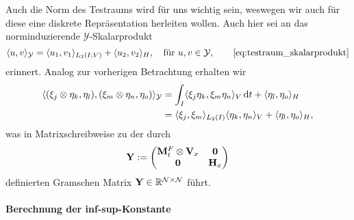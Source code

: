 \documentclass[../main.tex]{subfiles}
\begin{document}
Auch die Norm des Testraums wird für uns wichtig sein, weswegen wir auch für diese eine diskrete Repräsentation herleiten wollen.
Auch hier sei an das norminduzierende $\mathcal Y$-Skalarprodukt
\begin{equation}
    \skp{u}{v}{\mathcal Y} = \skp{u_{1}}{v_{1}}{L_2(I; V)} + \skp{u_{2}}{v_{2}}{H}, \quad \text{für } u, v \in \mathcal Y,
    \tag*{\cref{eq:testraum_skalarprodukt}}
\end{equation}
erinnert.
Analog zur vorherigen Betrachtung erhalten wir
\begin{align}
    \langle(\xi_{j} \otimes \eta_{k}, \eta_{l}),(\xi_{m} \otimes \eta_{n}, \eta_{o})\rangle_{\mathcal Y}
    &= \int_{I} \langle\xi_{j} \eta_{k},\xi_{m} \eta_{n}\rangle_{V} \mathop{}\!\mathrm{d} t + \langle\eta_{l},\eta_{o}\rangle_{H}
    \\&= \langle\xi_{j},\xi_{m}\rangle_{L_{2}(I)} \langle\eta_{k},\eta_{n}\rangle_{V} + \langle\eta_{l},\eta_{o}\rangle_{H},
\end{align}
was in Matrixschreibweise zu der durch
\begin{equation}
    \mathbf{Y} := \begin{pmatrix}
    \mathbf{M}_{t}^{F} \otimes \mathbf{V}_{x} & \mathbf{0}\\
    \mathbf{0} & \mathbf{H}_{x}
    \end{pmatrix}
\end{equation}
definierten Gramschen Matrix $\mathbf{Y} \in \mathbb{R}^{\mathcal N \times \mathcal N}$ führt.

\paragraph{Berechnung der inf-sup-Konstante} %
\label{par:berechnung_der_inf_sup_konstante}
\end{document}

